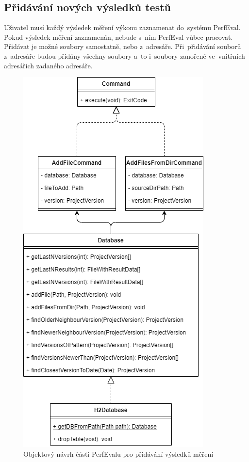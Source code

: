 \subsection{Přidávání nových výsledků testů}

Uživatel musí každý výsledek měření výkonu zaznamenat do~systému PerfEval. Pokud výsledek měření zaznamenán, nebude s~ním
PerfEval vůbec pracovat. Přidávat je možné soubory samostatně, nebo z~adresáře. Při~přidávání souborů z~adresáře budou
přidány všechny soubory a~to i~soubory zanořené ve~vnitřních adresářích zadaného adresáře.

\begin{figure}[!ht]
    \centering
    \includegraphics[height=0.5\textheight]{../img/perfeval_h2db.png}
    \caption{Objektový návrh části PerfEvalu pro přidávání výsledků měření}
\end{figure}

